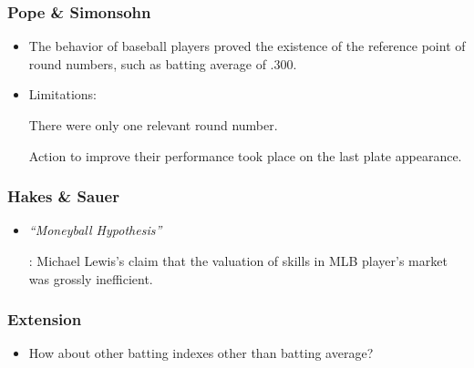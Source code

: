 \documentclass[dvipdfmx,12pt]{beamer}
\begin{document}
\begin{frame}\frametitle{Pope \& Simonsohn}

 \begin{itemize}
 
 \item The behavior of baseball players proved the existence of the reference point of round numbers, such as batting average of .300.
 
 \item Limitations:
 
 There were only one relevant round number.
 
 Action to improve their performance took place on the last plate appearance.
 
 \end{itemize}

\end{frame}

\begin{frame}\frametitle{Hakes \& Sauer}

\begin{itemize}

\item \textit{``Moneyball Hypothesis''}

: Michael Lewis's claim that the valuation of skills in MLB player's market was grossly inefficient.

\end{itemize}

\end{frame}

\begin{frame}\frametitle{Extension}

 \begin{itemize}
 
 \item How about other batting indexes other than batting average?
 
 
 \end{itemize}

\end{frame}
\end{document}
